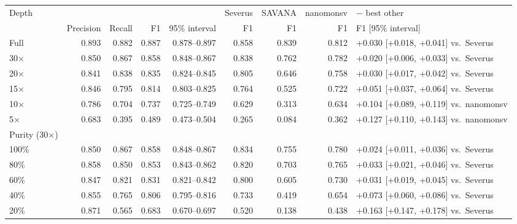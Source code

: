 \begin{tabular}{lrrrrrrrl}
\toprule
Depth & \multicolumn{4}{c}{\tool{}} & Severus & SAVANA & nanomonsv & \tool{} $-$ best other \\
\cmidrule(lr){2-5}
 & Precision & Recall & F1 & 95\% interval & F1 & F1 & F1 & F1 [95\% interval] \\
\midrule
Full & 0.893 & 0.882 & 0.887 & 0.878--0.897 & 0.858 & 0.839 & 0.812 & +0.030 [+0.018, +0.041] vs.\ Severus \\
30$\times$ & 0.850 & 0.867 & 0.858 & 0.848--0.867 & 0.838 & 0.762 & 0.782 & +0.020 [+0.006, +0.033] vs.\ Severus \\
20$\times$ & 0.841 & 0.838 & 0.835 & 0.824--0.845 & 0.805 & 0.646 & 0.758 & +0.030 [+0.017, +0.042] vs.\ Severus \\
15$\times$ & 0.846 & 0.795 & 0.814 & 0.803--0.825 & 0.764 & 0.525 & 0.722 & +0.051 [+0.037, +0.064] vs.\ Severus \\
10$\times$ & 0.786 & 0.704 & 0.737 & 0.725--0.749 & 0.629 & 0.313 & 0.634 & +0.104 [+0.089, +0.119] vs.\ nanomonsv \\
5$\times$ & 0.683 & 0.395 & 0.489 & 0.473--0.504 & 0.265 & 0.084 & 0.362 & +0.127 [+0.110, +0.143] vs.\ nanomonsv \\
\midrule
Purity (30$\times$) & & & & & & & \\
\midrule
100\% & 0.850 & 0.867 & 0.858 & 0.848--0.867 & 0.834 & 0.755 & 0.780 & +0.024 [+0.011, +0.036] vs.\ Severus \\
80\% & 0.858 & 0.850 & 0.853 & 0.843--0.862 & 0.820 & 0.703 & 0.765 & +0.033 [+0.021, +0.046] vs.\ Severus \\
60\% & 0.847 & 0.821 & 0.831 & 0.821--0.842 & 0.800 & 0.605 & 0.730 & +0.031 [+0.019, +0.045] vs.\ Severus \\
40\% & 0.855 & 0.765 & 0.806 & 0.795--0.816 & 0.733 & 0.419 & 0.654 & +0.073 [+0.060, +0.086] vs.\ Severus \\
20\% & 0.871 & 0.565 & 0.683 & 0.670--0.697 & 0.520 & 0.138 & 0.438 & +0.163 [+0.147, +0.178] vs.\ Severus \\
\bottomrule
\end{tabular}
